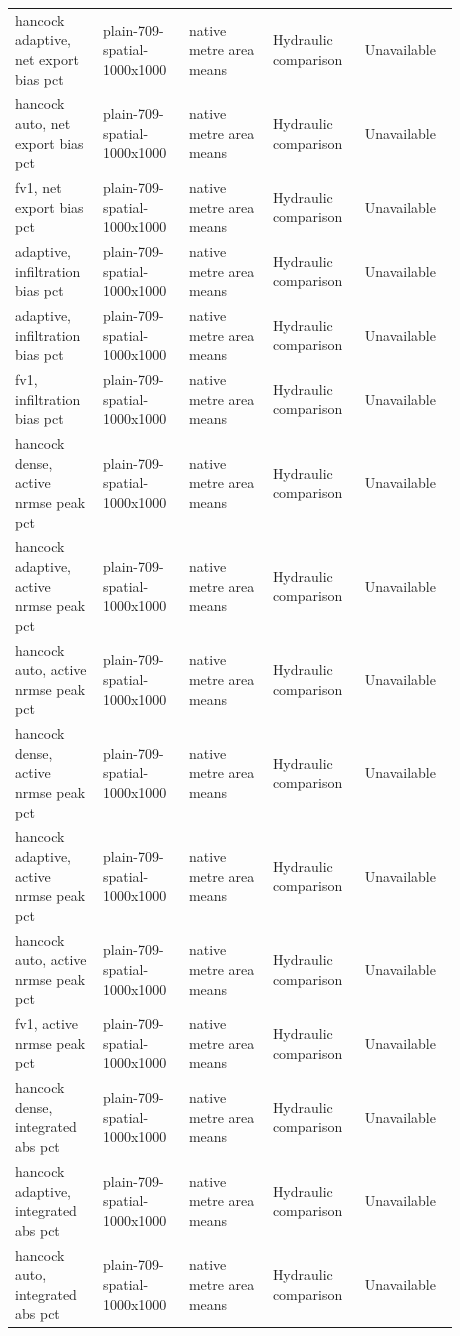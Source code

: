 \begin{longtable}{p{0.1760\linewidth}p{0.1760\linewidth}p{0.1760\linewidth}p{0.1760\linewidth}p{0.1760\linewidth}}
hancock adaptive, net export bias pct & plain-709-spatial-1000x1000 & native metre area means & Hydraulic comparison & Unavailable \\
hancock auto, net export bias pct & plain-709-spatial-1000x1000 & native metre area means & Hydraulic comparison & Unavailable \\
fv1, net export bias pct & plain-709-spatial-1000x1000 & native metre area means & Hydraulic comparison & Unavailable \\
adaptive, infiltration bias pct & plain-709-spatial-1000x1000 & native metre area means & Hydraulic comparison & Unavailable \\
adaptive, infiltration bias pct & plain-709-spatial-1000x1000 & native metre area means & Hydraulic comparison & Unavailable \\
fv1, infiltration bias pct & plain-709-spatial-1000x1000 & native metre area means & Hydraulic comparison & Unavailable \\
hancock dense, active nrmse peak pct & plain-709-spatial-1000x1000 & native metre area means & Hydraulic comparison & Unavailable \\
hancock adaptive, active nrmse peak pct & plain-709-spatial-1000x1000 & native metre area means & Hydraulic comparison & Unavailable \\
hancock auto, active nrmse peak pct & plain-709-spatial-1000x1000 & native metre area means & Hydraulic comparison & Unavailable \\
hancock dense, active nrmse peak pct & plain-709-spatial-1000x1000 & native metre area means & Hydraulic comparison & Unavailable \\
hancock adaptive, active nrmse peak pct & plain-709-spatial-1000x1000 & native metre area means & Hydraulic comparison & Unavailable \\
hancock auto, active nrmse peak pct & plain-709-spatial-1000x1000 & native metre area means & Hydraulic comparison & Unavailable \\
fv1, active nrmse peak pct & plain-709-spatial-1000x1000 & native metre area means & Hydraulic comparison & Unavailable \\
hancock dense, integrated abs pct & plain-709-spatial-1000x1000 & native metre area means & Hydraulic comparison & Unavailable \\
hancock adaptive, integrated abs pct & plain-709-spatial-1000x1000 & native metre area means & Hydraulic comparison & Unavailable \\
hancock auto, integrated abs pct & plain-709-spatial-1000x1000 & native metre area means & Hydraulic comparison & Unavailable \\

\end{longtable}
